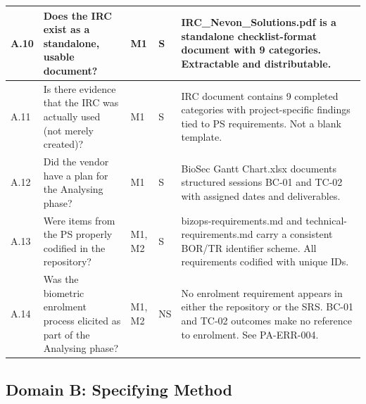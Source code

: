 \documentclass[11pt,a4paper]{article}
\begin{document}
\begin{longtable}{|L{0.8cm}|L{4cm}|L{1.3cm}|L{1.3cm}|L{5.5cm}|}
A.10 & Does the IRC exist as a standalone, usable document? & M1 & S & IRC\_Nevon\_Solutions.pdf is a standalone checklist-format document with 9 categories. Extractable and distributable. \\\hline
A.11 & Is there evidence that the IRC was actually used (not merely created)? & M1 & S & IRC document contains 9 completed categories with project-specific findings tied to PS requirements. Not a blank template. \\\hline
A.12 & Did the vendor have a plan for the Analysing phase? & M1 & S & BioSec Gantt Chart.xlsx documents structured sessions BC-01 and TC-02 with assigned dates and deliverables. \\\hline
A.13 & Were items from the PS properly codified in the repository? & M1, M2 & S & bizops-requirements.md and technical-requirements.md carry a consistent BOR/TR identifier scheme. All requirements codified with unique IDs. \\\hline
A.14 & Was the biometric enrolment process elicited as part of the Analysing phase? & M1, M2 & NS & No enrolment requirement appears in either the repository or the SRS. BC-01 and TC-02 outcomes make no reference to enrolment. See PA-ERR-004. \\\hline
\end{longtable}

\subsection{Domain B: Specifying Method}
\end{document}

